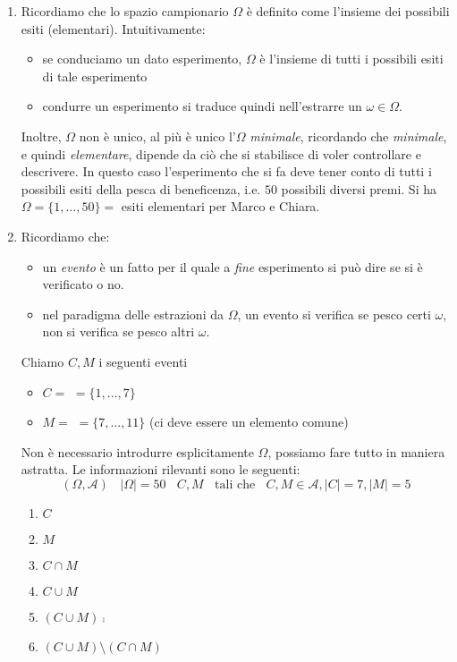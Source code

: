 \begin{enumerate}
	\item Ricordiamo che lo spazio campionario $\Omega $ è definito come l'insieme dei possibili esiti (elementari). Intuitivamente:
	\begin{itemize}
		\item se conduciamo un dato esperimento, $\Omega $ è l'insieme di tutti i possibili esiti di tale esperimento
		\item condurre un esperimento si traduce quindi nell'estrarre un $\omega \in \Omega $.
	\end{itemize}

Inoltre, $\Omega $ non è unico, al più è unico l'$\Omega $ \textit{minimale}, ricordando che \textit{minimale}, e quindi \textit{elementare}, dipende da ciò che si stabilisce di voler controllare e descrivere. In questo caso l'esperimento che si fa deve tener conto di tutti i possibili esiti della pesca di beneficenza, i.e. $50$ possibili diversi premi. Si ha $\Omega =\{1,\dots ,50\} =$ esiti elementari per Marco e Chiara.
	\item Ricordiamo che:
	\begin{itemize}
		\item un \textit{evento} è un fatto per il quale a \textit{fine} esperimento si può dire se si è verificato o no.
		\item nel paradigma delle estrazioni da $\Omega $, un evento si verifica se pesco certi $\omega $, non si verifica se pesco altri $\omega $.
	\end{itemize}

	Chiamo $C,M$ i seguenti eventi
	\begin{itemize}
		\item $C=$  $=\{1,\dots ,7\}$
		\item $M=$  $=\{7,\dots ,11\}$ (ci deve essere un elemento comune)
	\end{itemize}

\begin{oss}
Non è necessario introdurre esplicitamente $\Omega $, possiamo fare tutto in maniera astratta. Le informazioni rilevanti sono le seguenti:
\begin{equation*}
( \Omega ,\mathcal{A}) \ \ \ \ | \Omega | =50\ \ \ \ C,M\ \ \ \ \text{tali che} \ \ \ \ C,M\in \mathcal{A} ,| C| =7,| M| =5
\end{equation*}
\end{oss}
\begin{enumerate}
	\item $C$
	\item $M$
	\item $C\cap M$
	\item $C\cup M$
	\item $( C\cup M)\comp$
	\item $( C\cup M) \setminus ( C\cap M)$
\end{enumerate}


\end{enumerate}
